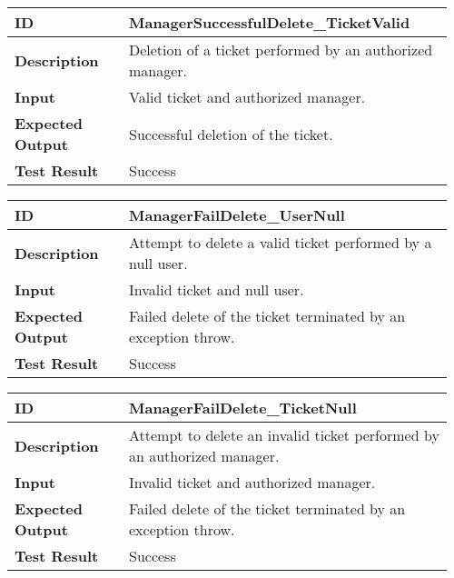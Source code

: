 \begin{table}[H]
	\centering
	\begin{tabular}{@{}p{0.25\linewidth}p{0.71\linewidth}@{}}
		\toprule
		\textbf{ID} & ManagerSuccessfulDelete\_TicketValid \\
		\midrule
		\textbf{Description} & Deletion of a ticket performed by an authorized manager. \\
		\midrule
		\textbf{Input} & Valid ticket and authorized manager.\\
		\midrule
		\textbf{Expected Output} & Successful deletion of the ticket.\\
		\midrule
		\textbf{Test Result} & Success\\
		\bottomrule
	\end{tabular}
\end{table}

\begin{table}[H]
	\centering
	\begin{tabular}{@{}p{0.25\linewidth}p{0.71\linewidth}@{}}
		\toprule
		\textbf{ID} & ManagerFailDelete\_UserNull \\
		\midrule
		\textbf{Description} & Attempt to delete a valid ticket performed by a null user. \\
		\midrule
		\textbf{Input} & Invalid ticket and null user.\\
		\midrule
		\textbf{Expected Output} & Failed delete of the ticket terminated by an exception throw.\\
		\midrule
		\textbf{Test Result} & Success\\
		\bottomrule
	\end{tabular}
\end{table}

\begin{table}[H]
	\centering
	\begin{tabular}{@{}p{0.25\linewidth}p{0.71\linewidth}@{}}
		\toprule
		\textbf{ID} & ManagerFailDelete\_TicketNull \\
		\midrule
		\textbf{Description} & Attempt to delete an invalid ticket performed by an authorized manager. \\
		\midrule
		\textbf{Input} & Invalid ticket and authorized manager.\\
		\midrule
		\textbf{Expected Output} & Failed delete of the ticket terminated by an exception throw.\\
		\midrule
		\textbf{Test Result} & Success\\
		\bottomrule
	\end{tabular}
\end{table}

